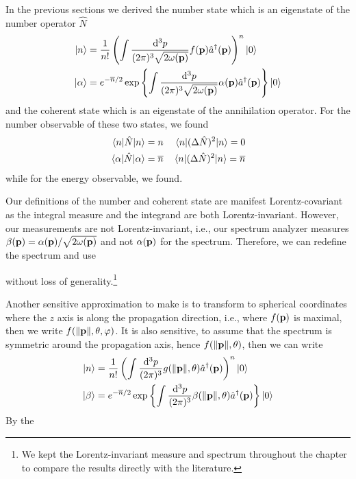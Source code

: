 In the previous sections we derived the number state which is an eigenstate of the number operator $\hat{N}$
\begin{align}
	\ket{n}
	&=
	\frac{1}{n!}
	\left(
		\int\frac{\dd[3]{p}}{(2\pi)^3\sqrt{2\omega(\vb{p})}}
		f(\vb{p})
		\hat{a}^\dagger(\vb{p})
	\right)^n
	\ket{0}
	\\
	\ket{\alpha}
	&=
	e^{-\overline{n}/2}
	\exp\left\{
		\int\frac{\dd[3]{p}}{(2\pi)^3\sqrt{2\omega(\vb{p})}}
		\alpha(\vb{p})
		\hat{a}^\dagger(\vb{p})
	\right\}
	\ket{0}
\end{align}
and the coherent state which is an eigenstate of the annihilation operator.
For the number observable of these two states, we found
\begin{align}
	\expval{\hat{N}}{n}
	=
	n
	&&
	\expval{(\Delta\hat{N})^2}{n}
	=
	0
	\\
	\expval{\hat{N}}{\alpha}
	=
	\overline{n}
	&&
	\expval{(\Delta\hat{N})^2}{n}
	=
	\overline{n}
\end{align}
while for the energy observable, we found.

Our definitions of the number and coherent state are manifest Lorentz-covariant as the integral measure and the integrand are both Lorentz-invariant.
However, our measurements are not Lorentz-invariant, i.e., our spectrum analyzer measures $\beta(\vb{p})=\alpha(\vb{p})/\sqrt{2\omega(\vb{p})}$ and not $\alpha(\vb{p})$ for the spectrum.
Therefore, we can redefine the spectrum and use

without loss of generality.\footnote{We kept the Lorentz-invariant measure and spectrum throughout the chapter to compare the results directly with the literature.}

Another sensitive approximation to make is to transform to spherical coordinates where the $z$ axis is along the propagation direction, i.e., where $f(\vb{p})$ is maximal, then we write $f(\norm{\vb{p}},\theta,\varphi)$.
It is also sensitive, to assume that the spectrum is symmetric around the propagation axis, hence $f(\norm{\vb{p}},\theta)$, then we can write
\begin{align}
	\ket{n}
	&=
	\frac{1}{n!}
	\left(
		\int\frac{\dd[3]{p}}{(2\pi)^3}
		g(\norm{\vb{p}},\theta)
		\hat{a}^\dagger(\vb{p})
	\right)^n
	\ket{0}
	\\
	\ket{\beta}
	&=
	e^{-\overline{n}/2}
	\exp\left\{
		\int\frac{\dd[3]{p}}{(2\pi)^3}
		\beta(\norm{\vb{p}},\theta)
		\hat{a}^\dagger(\vb{p})
	\right\}
	\ket{0}
\end{align}
By the 